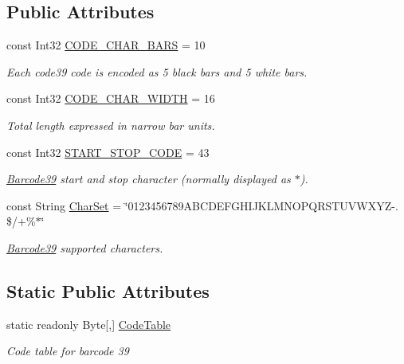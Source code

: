\subsection*{Public Attributes}
\begin{DoxyCompactItemize}
\item 
const Int32 \hyperlink{class_pdf_file_writer_1_1_barcode39_a707b4e705e1f5ffd2a1fb48fdde8421a}{C\+O\+D\+E\+\_\+\+C\+H\+A\+R\+\_\+\+B\+A\+RS} = 10
\begin{DoxyCompactList}\small\item\em Each code39 code is encoded as 5 black bars and 5 white bars. \end{DoxyCompactList}\item 
const Int32 \hyperlink{class_pdf_file_writer_1_1_barcode39_a39d2b92ae23e401f41641ca3dc9d2cfb}{C\+O\+D\+E\+\_\+\+C\+H\+A\+R\+\_\+\+W\+I\+D\+TH} = 16
\begin{DoxyCompactList}\small\item\em Total length expressed in narrow bar units. \end{DoxyCompactList}\item 
const Int32 \hyperlink{class_pdf_file_writer_1_1_barcode39_a73c79a713ce1bc450b695c2e1a406cc6}{S\+T\+A\+R\+T\+\_\+\+S\+T\+O\+P\+\_\+\+C\+O\+DE} = 43
\begin{DoxyCompactList}\small\item\em \hyperlink{class_pdf_file_writer_1_1_barcode39}{Barcode39} start and stop character (normally displayed as $\ast$). \end{DoxyCompactList}\item 
const String \hyperlink{class_pdf_file_writer_1_1_barcode39_a79a89513dba2fec56706df4bd7a009e1}{Char\+Set} = \char`\"{}0123456789\+A\+B\+C\+D\+E\+F\+G\+H\+I\+J\+K\+L\+M\+N\+O\+P\+Q\+R\+S\+T\+U\+V\+W\+X\+Y\+Z-\/. \$/+\%$\ast$\char`\"{}
\begin{DoxyCompactList}\small\item\em \hyperlink{class_pdf_file_writer_1_1_barcode39}{Barcode39} supported characters. \end{DoxyCompactList}\end{DoxyCompactItemize}
\subsection*{Static Public Attributes}
\begin{DoxyCompactItemize}
\item 
static readonly Byte\mbox{[},\mbox{]} \hyperlink{class_pdf_file_writer_1_1_barcode39_a7f4ebbab26f4b6ee21066c7aed85a738}{Code\+Table}
\begin{DoxyCompactList}\small\item\em Code table for barcode 39 \end{DoxyCompactList}\end{DoxyCompactItemize}
